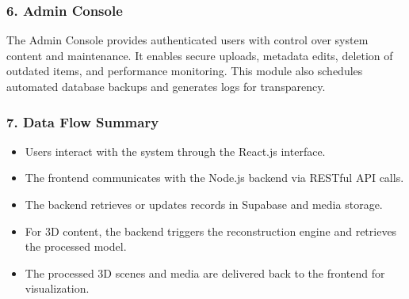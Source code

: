 \subsubsection*{6. Admin Console}
The Admin Console provides authenticated users with control over system content and maintenance. It enables secure uploads, metadata edits, deletion of outdated items, and performance monitoring. This module also schedules automated database backups and generates logs for transparency.

\subsubsection*{7. Data Flow Summary}
\begin{itemize}
    \item Users interact with the system through the React.js interface.
    \item The frontend communicates with the Node.js backend via RESTful API calls.
    \item The backend retrieves or updates records in Supabase and media storage.
    \item For 3D content, the backend triggers the reconstruction engine and retrieves the processed model.
    \item The processed 3D scenes and media are delivered back to the frontend for visualization.
\end{itemize}
